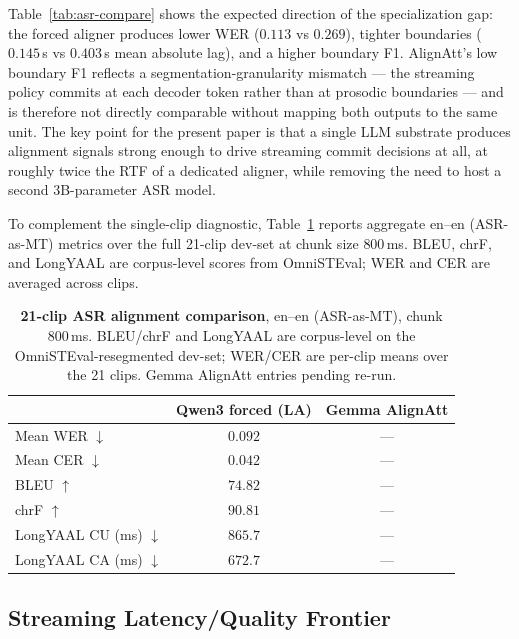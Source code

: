 \documentclass[11pt,twocolumn]{article}
\begin{document}
Table~\ref{tab:asr-compare} shows the expected direction of the
specialization gap: the forced aligner produces lower WER ($0.113$ vs
$0.269$), tighter boundaries ($0.145$\,s vs $0.403$\,s mean absolute
lag), and a higher boundary F1. AlignAtt's low boundary F1 reflects a
segmentation-granularity mismatch --- the streaming policy commits at
each decoder token rather than at prosodic boundaries --- and is
therefore not directly comparable without mapping both outputs to the
same unit. The key point for the present paper is that a single LLM
substrate produces alignment signals strong enough to drive streaming
commit decisions at all, at roughly twice the RTF of a dedicated
aligner, while removing the need to host a second 3B-parameter ASR model.

To complement the single-clip diagnostic, Table~\ref{tab:asr-21clip}
reports aggregate en--en (ASR-as-MT) metrics over the full 21-clip
dev-set at chunk size $800$\,ms. BLEU, chrF, and LongYAAL are corpus-level
scores from OmniSTEval; WER and CER are averaged across clips.

\begin{table}[t]
\centering
\small
\begin{tabular}{lcc}
\toprule
 & Qwen3 forced (LA) & Gemma AlignAtt \\
\midrule
Mean WER $\downarrow$           & $0.092$ & --- \\
Mean CER $\downarrow$           & $0.042$ & --- \\
BLEU $\uparrow$                 & $74.82$ & --- \\
chrF $\uparrow$                 & $90.81$ & --- \\
LongYAAL CU (ms) $\downarrow$   & $865.7$ & --- \\
LongYAAL CA (ms) $\downarrow$   & $672.7$ & --- \\
\bottomrule
\end{tabular}
\caption{\textbf{21-clip ASR alignment comparison}, en--en (ASR-as-MT),
chunk $800$\,ms. BLEU/chrF and LongYAAL are corpus-level on the
OmniSTEval-resegmented dev-set; WER/CER are per-clip means over the
21 clips. Gemma AlignAtt entries pending re-run.}
\label{tab:asr-21clip}
\end{table}

\subsection{Streaming Latency/Quality Frontier}
\label{sec:exp-frontier}
\end{document}
